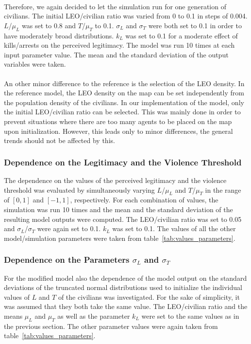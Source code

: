 \documentclass[11pt]{article}
\begin{document}
\\
Therefore, we again decided to let the simulation run for one generation of civilians. The initial LEO/civilian ratio was varied from 0 to 0.1 in steps of 0.004. $L$/$\mu_L$ was set to 0.8 and $T$/$\mu_T$ to 0.1. $\sigma_L$ and $\sigma_T$ were both set to 0.1 in order to have moderately broad distributions. $k_L$ was set to 0.1 for a moderate effect of kills/arrests on the perceived legitimacy. The model was run 10 times at each input parameter value. The mean and the standard deviation of the output variables were taken.\\
\\
An other minor difference to the reference is the selection of the LEO density. In the reference model, the LEO density on the map can be set independently from the population density of the civilians. In our implementation of the model, only the initial LEO/civilian ratio can be selected. This was mainly done in order to prevent situations where there are too many agents to be placed on the map upon initialization. However, this leads only to minor differences, the general trends should not be affected by this.

\subsubsection{Dependence on the Legitimacy and the Violence Threshold}
The dependence on the values of the perceived legitimacy and the violence threshold was evaluated by simultaneously varying $L$/$\mu_L$ and $T$/$\mu_T$ in the range of $[0,1]$ and $[-1,1]$, respectively. For each combination of values, the simulation was run 10 times and the mean and the standard deviation of the resulting model outputs were computed. The LEO/civilian ratio was set to 0.05 and $\sigma_L$/$\sigma_T$ were again set to 0.1. $k_L$ was set to 0.1. The values of all the other model/simulation parameters were taken from table~\ref{tab:values_parameters}.

\subsubsection{Dependence on the Parameters $\sigma_L$ and $\sigma_T$}
For the modified model also the dependence of the model output on the standard deviations of the truncated normal distributions used to initialize the individual values of $L$ and $T$ of the civilians was investigated. For the sake of simplicity, it was assumed that they both take the same value. The LEO/civilian ratio and the means $\mu_L$ and $\mu_T$ as well as the parameter $k_L$ were set to the same values as in the previous section. The other parameter values were again taken from table~\ref{tab:values_parameters}. 
\end{document}
